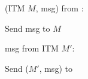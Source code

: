 \begin{bbox}[title={$\mathcal{D}_\mathsf{adv}$}]

\OnInput (ITM $M$, \textsf{msg}) from \Env:

	\quad Send \textsf{msg} to $M$
	
\OnInput \textsf{msg} from ITM $M'$:

	\quad Send ($M'$, \textsf{msg}) to \Env
\end{bbox}